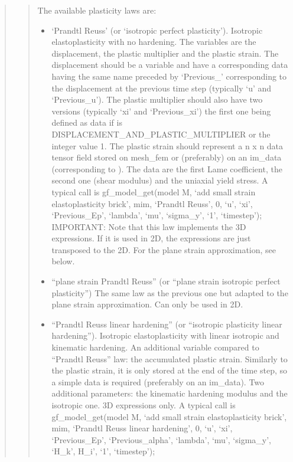 \documentclass[a4paper,11pt,english]{sphinxmanual}
\begin{document}
\begin{quote}
\begin{quote}
\sphinxAtStartPar
The available plasticity laws are:
\begin{itemize}
\item {} 
\sphinxAtStartPar
‘Prandtl Reuss’ (or ‘isotropic perfect plasticity’).
Isotropic elasto\sphinxhyphen{}plasticity with no hardening. The variables are the
displacement, the plastic multiplier and the plastic strain.
The displacement should be a variable and have a corresponding data
having the same name preceded by ‘Previous\_’ corresponding to the
displacement at the previous time step (typically ‘u’ and ‘Previous\_u’).
The plastic multiplier should also have two versions (typically ‘xi’
and ‘Previous\_xi’) the first one being defined as data if
 is DISPLACEMENT\_AND\_PLASTIC\_MULTIPLIER
or the integer value 1.
The plastic strain should represent a n x n data tensor field stored
on mesh\_fem or (preferably) on an im\_data (corresponding to ).
The data are the first Lame coefficient, the second one (shear modulus)
and the uniaxial yield stress. A typical call is
gf\_model\_get(model M, ‘add small strain elastoplasticity brick’, mim, ‘Prandtl Reuss’, 0, ‘u’, ‘xi’, ‘Previous\_Ep’, ‘lambda’, ‘mu’, ‘sigma\_y’, ‘1’, ‘timestep’);
IMPORTANT: Note that this law implements
the 3D expressions. If it is used in 2D, the expressions are just
transposed to the 2D. For the plane strain approximation, see below.

\item {} 
\sphinxAtStartPar
“plane strain Prandtl Reuss”
(or “plane strain isotropic perfect plasticity”)
The same law as the previous one but adapted to the plane strain
approximation. Can only be used in 2D.

\item {} 
\sphinxAtStartPar
“Prandtl Reuss linear hardening”
(or “isotropic plasticity linear hardening”).
Isotropic elasto\sphinxhyphen{}plasticity with linear isotropic and kinematic
hardening. An additional variable compared to “Prandtl Reuss” law:
the accumulated plastic strain. Similarly to the plastic strain, it
is only stored at the end of the time step, so a simple data is
required (preferably on an im\_data).
Two additional parameters: the kinematic hardening modulus and the
isotropic one. 3D expressions only. A typical call is
gf\_model\_get(model M, ‘add small strain elastoplasticity brick’, mim, ‘Prandtl Reuss linear hardening’, 0, ‘u’, ‘xi’, ‘Previous\_Ep’, ‘Previous\_alpha’, ‘lambda’, ‘mu’, ‘sigma\_y’, ‘H\_k’, H\_i’, ‘1’, ‘timestep’);


\end{itemize}
\end{quote}
\end{quote}
\end{document}
